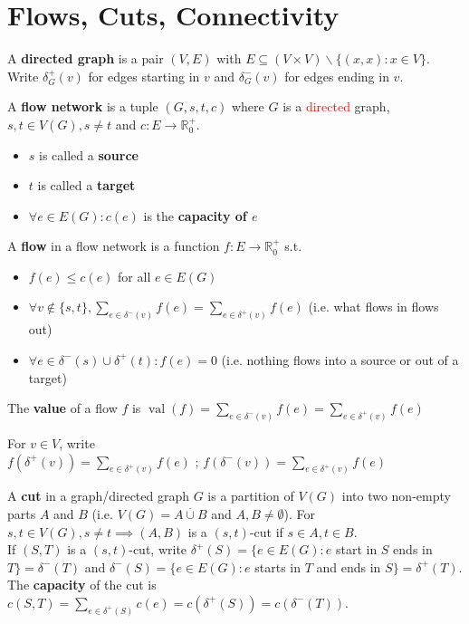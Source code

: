 \section{Flows, Cuts, Connectivity}
\begin{definition}\label{4.1}
    A \textbf{directed graph} is a pair $(V,E)$ with $E\subseteq (V\times V)\backslash\{(x,x):x\in V\}$. Write $\delta_G^+(v)$ for edges starting in $v$ and $\delta_G ^-(v)$ for edges ending in $v$.
\end{definition}
\vspace{0.5cm}
\begin{definition}\label{4.2}
    A \textbf{flow network} is a tuple $(G,s,t,c)$ where $G$ is a \textcolor{red}{directed} graph, $s,t\in V(G),s\neq t$ and $c:E\to\mathbb{R}_0^+$.
    \begin{itemize}
        \item $s$ is called a \textbf{source}
        \item $t$ is called a \textbf{target}
        \item $\forall e\in E(G):c(e)$ is the \textbf{capacity of $e$}
    \end{itemize}
    A \textbf{flow} in a flow network is a function $f:E\to\mathbb{R}^+_0$ s.t.
    \begin{itemize}
        \item $f(e)\leq c(e)$ for all $e\in E(G)$
        \item $\forall v\notin\{s,t\},\sum\limits_{e\in\delta^-(v)} f(e)=\sum\limits_{e\in\delta^+(v)}f(e)$ (i.e. what flows in flows out)
        \item $\forall e\in\delta^-(s)\cup\delta^+(t):f(e)=0$ (i.e. nothing flows into a source or out of a target)
    \end{itemize}
    The \textbf{value} of a flow $f$ is $\operatorname{val}(f)=\sum\limits_{e\in\delta^-(v)} f(e)=\sum\limits_{e\in\delta^+(v)}f(e)$
\end{definition}
\begin{remark}\label{4.3}
    For $v\in V$, write $f(\delta^+(v))=\sum\limits_{e\in\delta^+(v)} f(e) \text{ ; }f(\delta^-(v))=\sum\limits_{e\in\delta^+(v)}f(e)$
\end{remark}
\vspace{0.5cm}
\begin{definition}\label{4.4}
    A \textbf{cut} in a graph/directed graph $G$ is a partition of $V(G)$ into two non-empty parts $A$ and $B$ (i.e. $V(G)=A\stackrel{.}{\cup} B$ and $A,B\neq\emptyset$). For $s,t\in V(G),s\neq t \implies (A,B)$ is a $(s,t)$-cut if $s\in A,t\in B$.\\
    If $(S,T)$ is a $(s,t)$-cut, write $\delta^+(S)=\{e\in E(G):e$ start in $S$ ends in $T\}=\delta^-(T)$ and $\delta ^-(S)=\{e\in E(G): e$ starts in $T$ and ends in $S\}=\delta^+(T)$.\\
    The \textbf{capacity} of the cut is $c(S,T)=\sum\limits_{e\in \delta^+(S)}c(e)=c(\delta^+(S))=c(\delta^-(T))$.
\end{definition}
